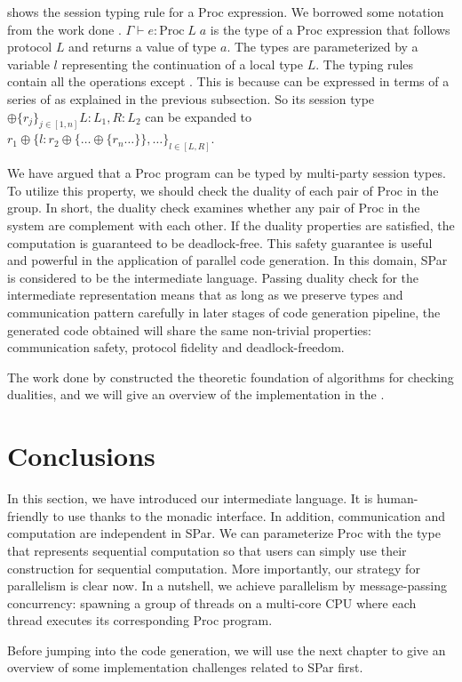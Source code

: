  shows the session typing rule for a Proc expression. We borrowed some notation from the work done \cite{AlgebraicMultipartyProtocol}. $\Gamma \vdash e : \text{Proc} \; L \; a$ is the type of a Proc expression that follows protocol $L$ and returns a value of type $a$. The types are parameterized by a variable $l$ representing the continuation of a local type $L$. The typing rules contain all the operations except . This is because  can be expressed in terms of a series of  as explained in the previous subsection. So its session type $\oplus \{r_j\}_{j \in [1,n]} {L:L_1, R: L_2}$ can be expanded to $r_1 \oplus \{l: r_2 \oplus \{\ldots \oplus\{r_n \ldots\}\},\ldots\}_{l \in [L, R]}$. 

We have argued that a Proc program can be typed by multi-party session types. To utilize this property, we should check the duality of each pair of Proc in the group. In short, the duality check examines whether any pair of Proc in the system are complement with each other. If the duality properties are satisfied, the computation is guaranteed to be deadlock-free. This safety guarantee is useful and powerful in the application of parallel code generation. In this domain, SPar is considered to be the intermediate language. Passing duality check for the intermediate representation means that as long as we preserve types and communication pattern carefully in later stages of code generation pipeline, the generated code obtained will share the same non-trivial properties: communication safety, protocol fidelity and deadlock-freedom.

The work done by \cite{coppoGentleIntroductionMultiparty2015} constructed the theoretic foundation of algorithms for checking dualities, and we will give an overview of the implementation in the .

\section{Conclusions}
In this section, we have introduced our intermediate language. It is human-friendly to use thanks to the monadic interface. In addition, communication and computation are independent in SPar. We can parameterize Proc with the type that represents sequential computation so that users can simply use their construction for sequential computation. More importantly, our strategy for parallelism is clear now. In a nutshell, we achieve parallelism by message-passing concurrency: spawning a group of threads on a multi-core CPU where each thread executes its corresponding Proc program.

Before jumping into the code generation, we will use the next chapter to give an overview of some implementation challenges related to SPar first.